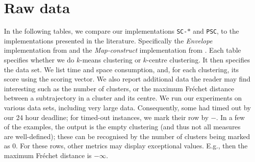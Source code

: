 \documentclass[11pt]{article}
\newcommand{\frechet}{Fr\'{e}chet\xspace}
\begin{document}
\section{Raw data}
\label{app:raw}
%
In the following tables, we compare our implementations \texttt{SC-}$\ast$ and \texttt{PSC}, to the implementations presented in the literature. Specifically the \emph{Envelope} implementation from \cite{agarwal2018subtrajectory} and the \emph{Map-construct} implementation from \cite{buchin2020improved}.
%
Each table specifies whether we do $k$-means clustering or $k$-centre clustering.
It then specifies the data set.
We list time and space consumption, and, for each clustering, its score using the scoring vector.
We also report additional data the reader may find interesting such as the number of clusters, or the maximum \frechet distance between a subtrajectory in a cluster and its centre.
%
We run our experiments on various data sets, including very large data. Consequently, some had timed out by our 24 hour deadline; for timed-out instances, we mark their row by $-$. In a few of the examples, the output is the empty clustering (and thus not all measures are well-defined); these can be recognised by the number of clusters being marked as $0$. 
For these rows, other metrics may display exceptional values. E.g., then the maximum \frechet distance is $-\infty$.
%
%
\clearpage
\end{document}
